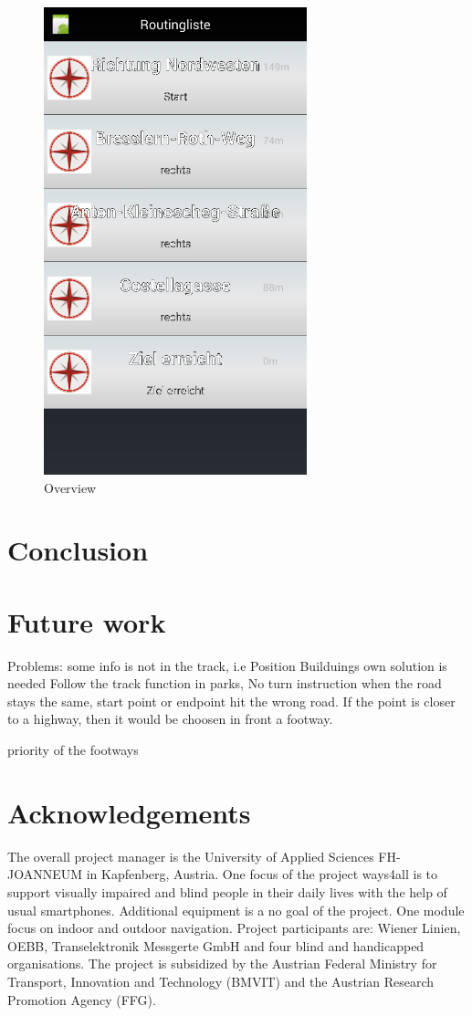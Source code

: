 \documentclass{sig-alternate}
\begin{document}
\begin{figure}
\centering
\includegraphics[width=3in]{App2.png}
\caption{Overview}
\end{figure}


\section{Conclusion}



\section{Future work}
Problems: some info is not  in the track, i.e Position Builduings  own solution is needed
Follow the track function in parks, No turn instruction when the road stays the same, start point or endpoint hit the wrong road. If the point is closer to a highway, then it would be choosen in front a footway. 

priority of the footways


\section{Acknowledgements}

 The overall project manager is the University of Applied Sciences FH-JOANNEUM in Kapfenberg, Austria. One focus of the project ways4all is to support visually impaired and blind people in their daily lives with the help of usual smartphones. Additional equipment is a no goal of the project. One module focus on indoor and outdoor navigation.
 Project
participants are: Wiener Linien, OEBB, Transelektronik Messgerte
GmbH and four blind and handicapped organisations.
The project is subsidized by the Austrian Federal Ministry
for Transport, Innovation and Technology (BMVIT) and the
Austrian Research Promotion Agency (FFG).
\end{document}
